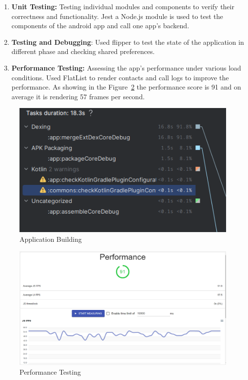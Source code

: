 \begin{enumerate}[label=\roman*.]
    \item \textbf{Unit Testing:} Testing individual modules and components to verify their correctness and functionality.
    Jest a Node.js module is used to test the components of the android app and call one app's backend.

    \item \textbf{Testing and Debugging}: Used flipper to test the state of the application in different phase and checking shared preferences.

    \item \textbf{Performance Testing:} Assessing the app's performance under various load conditions.
    Used FlatList to render contacts and call logs to improve the performance.
    As showing in the Figure~\ref{fig: Performance Testing} the performance score is 91 and on average it is rendering 57 frames per second.

\end{enumerate}

\begin{figure}[h]
    \centering
    \includegraphics[width=1\linewidth]{Media/img}
    \caption{Application Building}
    \label{fig:Application Building}
\end{figure}


\begin{figure}
    \centering
    \includegraphics[width=1\linewidth]{Media//Chapter 6/performance}
    \caption{Performance Testing}
    \label{fig: Performance Testing}
\end{figure}

